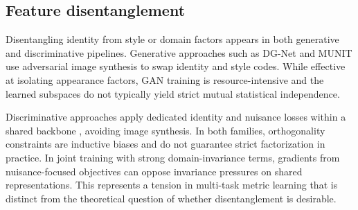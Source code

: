 \subsection{Feature disentanglement} \label{subsec:feature_disentanglement}
Disentangling identity from style or domain factors appears in both generative and discriminative pipelines. Generative approaches such as DG-Net \cite{zheng2019joint} and MUNIT \cite{huang2018multimodal} use adversarial image synthesis to swap identity and style codes. While effective at isolating appearance factors, GAN training is resource-intensive and the learned subspaces do not typically yield strict mutual statistical independence.

Discriminative approaches apply dedicated identity and nuisance losses within a shared backbone \cite{jin2020style}, avoiding image synthesis. In both families, orthogonality constraints are inductive biases and do not guarantee strict factorization in practice. In joint training with strong domain-invariance terms, gradients from nuisance-focused objectives can oppose invariance pressures on shared representations. This represents a tension in multi-task metric learning that is distinct from the theoretical question of whether disentanglement is desirable.



